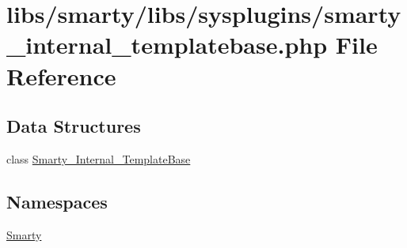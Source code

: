 \hypertarget{smarty__internal__templatebase_8php}{}\section{libs/smarty/libs/sysplugins/smarty\+\_\+internal\+\_\+templatebase.php File Reference}
\label{smarty__internal__templatebase_8php}
\subsection*{Data Structures}
\begin{DoxyCompactItemize}
\item 
class \hyperlink{class_smarty___internal___template_base}{Smarty\+\_\+\+Internal\+\_\+\+Template\+Base}
\end{DoxyCompactItemize}
\subsection*{Namespaces}
\begin{DoxyCompactItemize}
\item 
 \hyperlink{namespace_smarty}{Smarty}
\end{DoxyCompactItemize}
